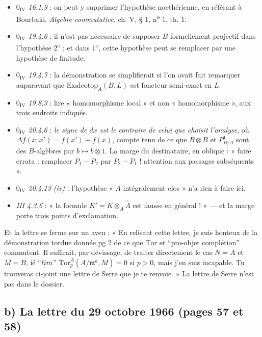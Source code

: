 \documentclass[11pt,a4paper]{article}
\begin{document}
\begin{itemize}
  \item \emph{$0_{\mathrm{IV}}$ 16.1.9} : on peut y supprimer l'hypothèse
  noethérienne, en référant à Bourbaki, \emph{Algèbre commutative}, ch. V, § 1,
  n\textsuperscript{o} 1, th. 1.
  \item \emph{$0_{\mathrm{IV}}$ 19.4.6} : il n'est pas nécessaire de supposer
  $B$ formellement projectif dans l'hypothèse 2\textsuperscript{o} ; et dans
  1\textsuperscript{o}, cette hypothèse peut se remplacer par une hypothèse de
  finitude.
  \item \emph{$0_{\mathrm{IV}}$ 19.4.7} : la démonstration se simplifierait si
  l'on avait fait remarquer auparavant que $\mathrm{Exalcotop}_{A}(B, L)$ est
  foncteur semi-exact en $L$.
  \item \emph{$0_{\mathrm{IV}}$ 19.8.3} : lire « homomorphisme local » et non
  « homomorphisme », aux trois endroits indiqués.
  \item \emph{$0_{\mathrm{IV}}$ 20.4.6} : \emph{le signe de $dx$ est le
  contraire de celui que choisit l'analyse}, où $\Delta f(x;x') = f(x') - f(x)$,
  compte tenu de ce que $B \otimes B$ et $P^{1}_{B/A}$ sont des $B$-algèbres par
  $b \mapsto b \otimes 1$. La marge du destinataire, en oblique : « faire
  errata : remplacer $P_{1} - P_{2}$ par $P_{2} - P_{1}$ ! attention aux
  passages subséquents ».
  \item \emph{$0_{\mathrm{IV}}$ 20.4.13 (iv)} : l'hypothèse « $A$ intégralement
  clos » n'a rien à faire ici.
  \item \emph{III 4.3.6} : « la formule $K' = K \otimes_{A} \widehat{A}$ est
  fausse en général ! » — et la marge porte trois points d'exclamation.
\end{itemize}

Et la lettre se ferme sur un aveu : « En relisant cette lettre, je suis honteux
de la démonstration tordue donnée pg 2 de ce que $\mathrm{Tor}$ et “pro-objet
complétion” commutent. Il suffirait, par dévissage, de traiter directement le
cas $N = A$ et $M = B$, ié “$\varprojlim$”
$\mathrm{Tor}^{A}_{p}(A/\mathfrak{m}^{k}, M) = 0$ si $p > 0$, mais j'en suis
incapable. Tu trouveras ci-joint une lettre de Serre que je te renvoie. »
La lettre de Serre n'est pas dans le dossier.

\subsection*{b) La lettre du 29 octobre 1966 (pages 57 et 58)}
\end{document}
